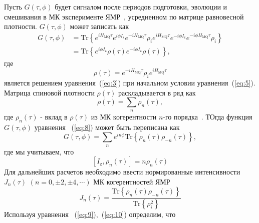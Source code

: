 \documentclass[utf8]{jetp}
\begin{document}
Пусть $G(\tau,\phi)$ будет сигналом после периодов подготовки, эволюции и смешивания в МК эксперименте ЯМР~\cite{Baum_1985}, усредненном по матрице равновесной плотности. $G(\tau,\phi)$ может записать как~\cite{Doronin_2019} 
%
\begin{equation}
    \begin{split}
        \label{eq:8}
        G(\tau,\phi) 
        & = \mathrm{Tr}\left\{
            e^{i H_\mathrm{MQ} \tau} e^{i\phi I_\mathrm{z}} e^{-i H_\mathrm{MQ}\tau} 
            \rho_i 
            e^{i H_\mathrm{MQ} \tau} e^{-i \phi I_\mathrm{z}} e^{-i \phi H_\mathrm{MQ} \tau} 
            \rho_i 
        \right\} \\
        & = \mathrm{Tr} \left\{
        e^{i \phi I_\mathrm{z}}
        \rho(\tau) 
        e^{-i \phi I_\mathrm{z}} 
        \rho(\tau) 
        \right\},
    \end{split}
\end{equation}
%
где
%
\begin{equation}
    \label{eq:9}
    \rho(\tau) 
    = e^{-i H_\mathrm{MQ} \tau } 
    \rho_i 
    e^{i H_\mathrm{MQ} \tau}
\end{equation}
%
является решением уравнения~(\ref{eq:3}) при начальном условии уравнения~(\ref{eq:5}).
Матрица спиновой плотности $\rho(\tau)$ раскладывается в ряд как
%
\begin{equation}
    \label{eq:10}
    \rho(\tau) = \sum\limits_n \rho_n(\tau),
\end{equation}
%
где $\rho_{n}(\tau)$ - вклад в $\rho(\tau)$ из МК когерентности $n$-го порядка~\cite{Fel_dman_1996}.
ТОгда функция $G(\tau,\phi)$ уравнения ~(\ref{eq:8}) может быть переписана как
%
\begin{equation}
    \label{eq:11}
    G(\tau,\phi) 
    = \sum\limits_n e^{i n \phi} \mathrm{Tr} \left\{ 
        \rho_{n}(\tau) \rho_{-n}(\tau) 
    \right\},
\end{equation}
%
где мы учитываем, что
%
\begin{equation}
    \label{eq:12}
    \left[ I_{\mathrm{z}},\rho_n(\tau) \right] = n \rho_n(\tau)
\end{equation}
%
Для дальнейших расчетов необходимо ввести нормированные интенсивности $J_{n}(\tau)$ $(n=0, \pm 2, \pm 4, \cdots)$ МК когерентностей ЯМР
%
\begin{equation}
    \label{eq:13}
    J_{n}(\tau) = \dfrac{\mathrm{Tr} \left\{
    \rho_{n}(\tau) \rho_{-n}(\tau) 
    \right\}} 
    {\mathrm{Tr} \left\{\rho^2_{i} \right\}}
\end{equation}
%
Используя уравнения ~(\ref{eq:9}),~(\ref{eq:10}) определим, что
\end{document}
